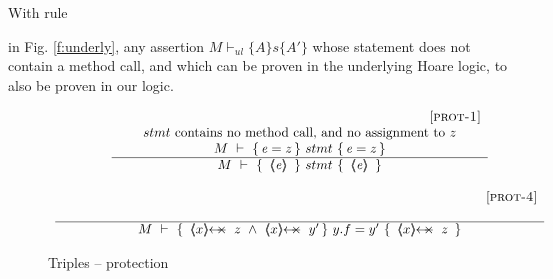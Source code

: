 With rule {{} in Fig. \ref{f:underly},  any assertion $M \vdash_{ul} \{ A \} s \{ A' \}$  whose statement does not contain a method call, and which 
can be proven in the underlying Hoare logic, to also be proven in our logic. %
 

\begin{figure}[tht]
$
\begin{array}{c}
	{{\inferruleSD{\hspace{2.3cm} [\sc{prot-1}]}
	{   stmt \ \mbox{contains no method call, and no assignment to $z$}
	\\
	{\hproves{M}  {\re = z} {\ stmt\ }{ \re=z} }
	}
	{\hproves{M} 
						{\  \inside{\re}  \ }
						{\  stmt \ }
						{\  \inside{\re}\ }
	}
}}
\\
\\
%
        {\inferruleSD{\hspace{5.3cm} [\sc{prot-4}]}
	{ }
	{\hproves{M} 
						{\ \protectedFrom{x}{z} \ \wedge \   \protectedFrom{x}{y'} }
						{\ y.f=y'\ }
						{\ \protectedFrom{x}{z} \ }
	}
}	 
\end{array}
 $
\caption{Triples -- protection}
\label{f:protection}
\end{figure}







}
